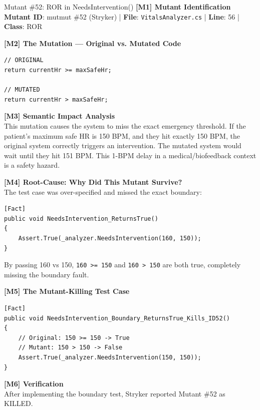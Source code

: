 \documentclass[11pt,a4paper]{article}
\begin{document}
\vspace{0.5cm}

\begin{mutantbox}{Mutant \#52: ROR in NeedsIntervention()}
\textbf{[M1] Mutant Identification}\\
\textbf{Mutant ID}: mutmut \#52 (Stryker) | \textbf{File}: \texttt{VitalsAnalyzer.cs} | \textbf{Line}: 56 | \textbf{Class}: ROR

\vspace{0.3cm}
\textbf{[M2] The Mutation — Original vs. Mutated Code}
\begin{lstlisting}[style=csharp]
// ORIGINAL
return currentHr >= maxSafeHr;

// MUTATED
return currentHr > maxSafeHr;
\end{lstlisting}

\textbf{[M3] Semantic Impact Analysis}\\
This mutation causes the system to miss the exact emergency threshold. If the patient's maximum safe HR is 150 BPM, and they hit exactly 150 BPM, the original system correctly triggers an intervention. The mutated system would wait until they hit 151 BPM. This 1-BPM delay in a medical/biofeedback context is a safety hazard.

\vspace{0.3cm}
\textbf{[M4] Root-Cause: Why Did This Mutant Survive?}\\
The test case was over-specified and missed the exact boundary:
\begin{lstlisting}[style=csharp]
[Fact]
public void NeedsIntervention_ReturnsTrue()
{
    Assert.True(_analyzer.NeedsIntervention(160, 150));
}
\end{lstlisting}
By passing 160 vs 150, \texttt{160 >= 150} and \texttt{160 > 150} are both true, completely missing the boundary fault.

\vspace{0.3cm}
\textbf{[M5] The Mutant-Killing Test Case}
\begin{lstlisting}[style=csharp]
[Fact]
public void NeedsIntervention_Boundary_ReturnsTrue_Kills_ID52()
{
    // Original: 150 >= 150 -> True
    // Mutant: 150 > 150 -> False
    Assert.True(_analyzer.NeedsIntervention(150, 150));
}
\end{lstlisting}

\textbf{[M6] Verification}\\
After implementing the boundary test, Stryker reported Mutant \#52 as KILLED.
\end{mutantbox}
\end{document}
